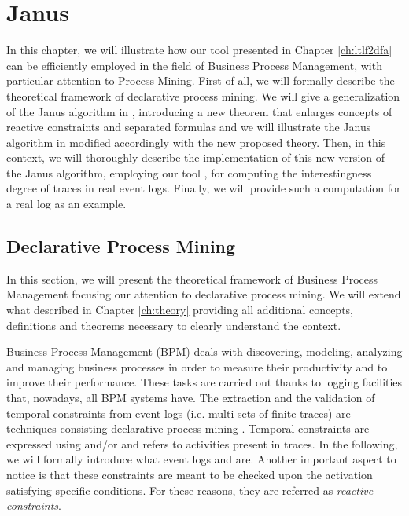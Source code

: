 \chapter{Janus}\label{ch:janus}
In this chapter, we will illustrate how our tool \LTLfToDFA presented in Chapter \ref{ch:ltlf2dfa} can be efficiently employed in the field of Business Process Management, with particular attention to Process Mining. First of all, we will formally describe the theoretical framework of declarative process mining. We will give a generalization of the Janus algorithm in \citep{cecconi2018interestingness}, introducing a new theorem that enlarges concepts of reactive constraints and separated formulas and we will illustrate the Janus algorithm in \citep{cecconi2018interestingness} modified accordingly with the new proposed theory. Then, in this context, we will thoroughly describe the implementation of this new version of the Janus algorithm, employing our tool \LTLfToDFA, for computing the interestingness degree of traces in real event logs. Finally, we will provide such a computation for a real log as an example. 
\section{Declarative Process Mining}
In this section, we will present the theoretical framework of Business Process Management focusing our attention to declarative process mining. We will extend what described in Chapter \ref{ch:theory} providing all additional concepts, definitions and theorems necessary to clearly understand the context.

Business Process Management (BPM) deals with discovering, modeling, analyzing and managing business processes in order to measure their productivity and to improve their performance. These tasks are carried out thanks to logging facilities that, nowadays, all BPM systems have. The extraction and the validation of temporal constraints from event logs (i.e. multi-sets of finite traces) are techniques consisting declarative process mining \citep{montali2010declarative}. Temporal constraints are expressed using \LTLf and/or \PLTL and refers to activities present in traces. In the following, we will formally introduce what event logs and \declare \citep{pesic2008constraint} are. Another important aspect to notice is that these constraints are meant to be checked upon the activation satisfying specific conditions. For these reasons, they are referred as \emph{reactive constraints}.
